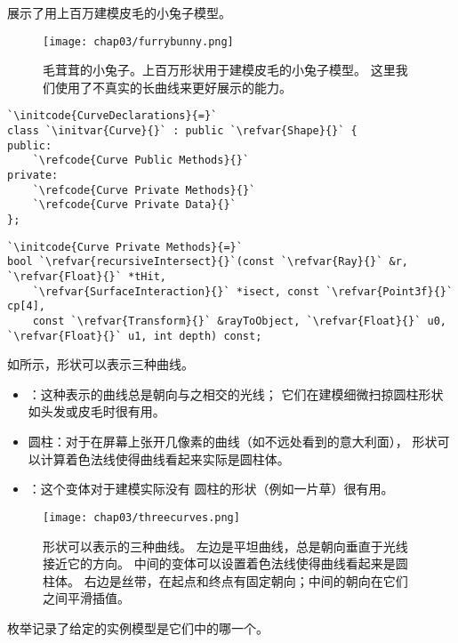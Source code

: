 展示了用上百万建模皮毛的小兔子模型。
\begin{figure}[htbp]
    \centering\texttt{[image: chap03/furrybunny.png]}
    \caption{毛茸茸的小兔子。上百万形状用于建模皮毛的小兔子模型。
        这里我们使用了不真实的长曲线来更好展示的能力。}
    \label{fig:3.17}
\end{figure}
\begin{lstlisting}
`\initcode{CurveDeclarations}{=}`
class `\initvar{Curve}{}` : public `\refvar{Shape}{}` {
public:
    `\refcode{Curve Public Methods}{}`
private:
    `\refcode{Curve Private Methods}{}`
    `\refcode{Curve Private Data}{}`
};
\end{lstlisting}
\begin{lstlisting}
`\initcode{Curve Private Methods}{=}`
bool `\refvar{recursiveIntersect}{}`(const `\refvar{Ray}{}` &r, `\refvar{Float}{}` *tHit,
    `\refvar{SurfaceInteraction}{}` *isect, const `\refvar{Point3f}{}` cp[4],
    const `\refvar{Transform}{}` &rayToObject, `\refvar{Float}{}` u0, `\refvar{Float}{}` u1, int depth) const;

\end{lstlisting}

如所示，形状可以表示三种曲线。
\begin{itemize}
    \item {}：这种表示的曲线总是朝向与之相交的光线；
          它们在建模细微扫掠圆柱形状如头发或皮毛时很有用。
    \item {\sffamily 圆柱}：对于在屏幕上张开几像素的曲线（如不远处看到的意大利面），
          形状可以计算着色法线使得曲线看起来实际是圆柱体。
    \item {}：这个变体对于建模实际没有
          圆柱的形状（例如一片草）很有用。
\end{itemize}
\begin{figure}[htbp]
    \centering\texttt{[image: chap03/threecurves.png]}
    \caption{\protect{}形状可以表示的三种曲线。
        左边是平坦曲线，总是朝向垂直于光线接近它的方向。
        中间的变体可以设置着色法线使得曲线看起来是圆柱体。
        右边是丝带，在起点和终点有固定朝向；中间的朝向在它们之间平滑插值。}
    \label{fig:3.18}
\end{figure}

枚举记录了给定的实例模型是它们中的哪一个。

